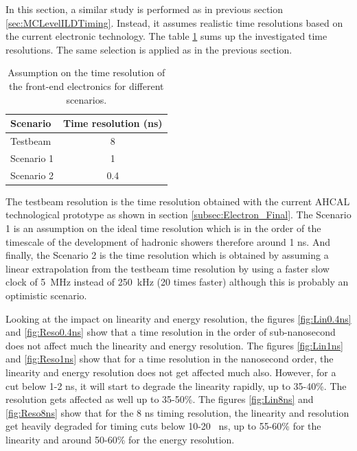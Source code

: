 In this section, a similar study is performed as in previous section \ref{sec:MCLevelILDTiming}. Instead, it assumes realistic time resolutions based on the current electronic technology. The table \ref{table:TimeReso} sums up the investigated time resolutions. The same selection is applied as in the previous section.

\begin{table}[htb!]
  \centering
  \caption{Assumption on the time resolution of the front-end electronics for different scenarios.} \label{table:TimeReso}
  \begin{tabular}{@{} lc @{}}
    \toprule
    Scenario & Time resolution (ns) \\
    \midrule
    Testbeam & 8 \\
    Scenario 1 & 1 \\
    Scenario 2 & 0.4 \\
    \bottomrule
  \end{tabular}
\end{table}

The testbeam resolution is the time resolution obtained with the current AHCAL technological prototype as shown in section \ref{subsec:Electron_Final}. The Scenario 1 is an assumption on the ideal time resolution which is in the order of the timescale of the development of hadronic showers therefore around 1 ns. And finally, the Scenario 2 is the time resolution which is obtained by assuming a linear extrapolation from the testbeam time resolution by using a faster slow clock of \SI{5}{\mega\hertz} instead of \SI{250}{\kilo\hertz} (20 times faster) although this is probably an optimistic scenario.

Looking at the impact on linearity and energy resolution, the figures \ref{fig:Lin0.4ns} and \ref{fig:Reso0.4ns} show that a time resolution in the order of sub-nanosecond does not affect much the linearity and energy resolution. The figures \ref{fig:Lin1ns} and \ref{fig:Reso1ns} show that for a time resolution in the nanosecond order, the linearity and energy resolution does not get affected much also. However, for a cut below 1-2 ns, it will start to degrade the linearity rapidly, up to 35-40\%. The resolution gets affected as well up to 35-50\%. The figures \ref{fig:Lin8ns} and \ref{fig:Reso8ns} show that for the 8 ns timing resolution, the linearity and resolution get heavily degraded for timing cuts below 10-20 \SI{}{\nano\second}, up to 55-60\% for the linearity and around 50-60\% for the energy resolution.


